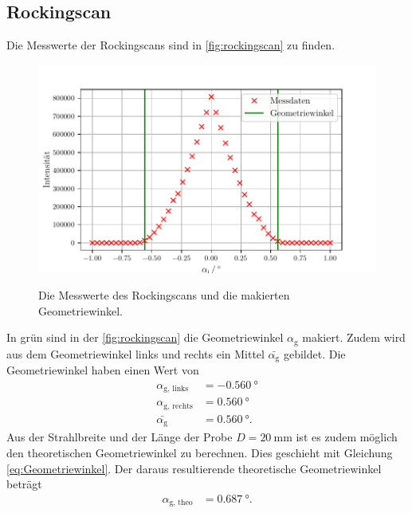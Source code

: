 \subsection{Rockingscan}
Die Messwerte der Rockingscans sind in \autoref{fig:rockingscan} zu finden.
\begin{figure}
    \centering
    \caption{Die Messwerte des Rockingscans und die makierten Geometriewinkel.}
    \includegraphics[width=\textwidth]{content/data/rockingscan.pdf}
    \label{fig:rockingscan}
\end{figure}
In grün sind in der \autoref{fig:rockingscan} die Geometriewinkel $\alpha_\text{g}$ makiert.
Zudem wird aus dem Geometriewinkel links und rechts ein Mittel $\bar{\alpha_\text{g}}$ gebildet.
Die Geometriewinkel haben einen Wert von 
\begin{align*}
    \alpha_\text{g, links} &= \SI{-0.560}{\degree} \\
    \alpha_\text{g, rechts} &= \SI{0.560}{\degree} \\
    \bar{\alpha_\text{g}} &= \SI{0.560}{\degree}.
\end{align*}
Aus der Strahlbreite und der Länge der Probe $D=\SI{20}{\milli\meter}$ ist es zudem möglich den theoretischen Geometriewinkel zu berechnen.
Dies geschieht mit Gleichung \eqref{eq:Geometriewinkel}.
Der daraus resultierende theoretische Geometriewinkel beträgt
\begin{align*}
    \alpha_\text{g, theo} &= \SI{0.687}{\degree}.
\end{align*}
\FloatBarrier

